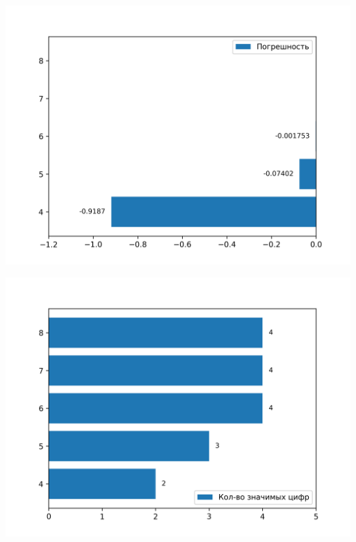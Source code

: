 \documentclass{article}
\begin{document}
\begin{center}
\includegraphics[width=\textwidth]{plots/series_fixed_error.png}
\end{center}
\begin{center}
\includegraphics[width=\textwidth]{plots/series_fixed_n_digits.png}
\end{center}
\end{document}
